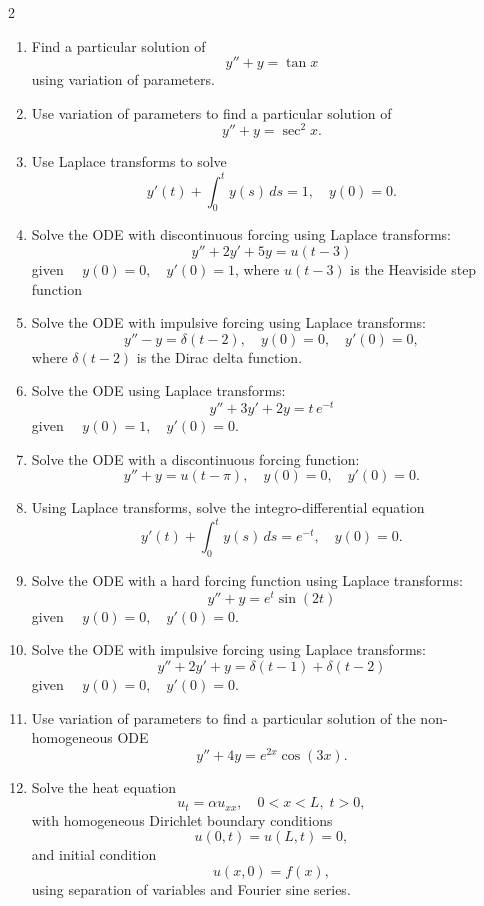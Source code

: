 \begin{multicols}{2}
\begin{enumerate}
  \item Find a particular solution of
    \[
    y'' + y = \tan x
    \]
    using variation of parameters.
    
  \item Use variation of parameters to find a particular solution of
    \[
    y'' + y = \sec^2 x.
    \]
        
  \item Use Laplace transforms to solve
    \[
    y'(t) + \int_0^t y(s) \, ds = 1, \quad y(0) = 0.
    \]
    
  \item Solve the ODE with discontinuous forcing using Laplace transforms:
    \[
    y'' + 2y' + 5y = u(t-3)
    \]
    given $\quad y(0)=0,\quad y'(0)=1$, where \(u(t-3)\) is the Heaviside step function
    
  \item Solve the ODE with impulsive forcing using Laplace transforms:
    \[
    y'' - y = \delta(t-2),\quad y(0)=0,\quad y'(0)=0,
    \]
    where \(\delta(t-2)\) is the Dirac delta function.
    
  \item Solve the ODE using Laplace transforms:
    \[
    y'' + 3y' + 2y = t\,e^{-t}
    \]
    given $\quad y(0)=1,\quad y'(0)=0.$
  \item Solve the ODE with a discontinuous forcing function:
    \[
    y'' + y = u(t-\pi),\quad y(0)=0,\quad y'(0)=0.
    \]
    
  \item Using Laplace transforms, solve the integro-differential equation
    \[
    y'(t) + \int_0^t y(s)\,ds = e^{-t},\quad y(0)=0.
    \]
    
  \item Solve the ODE with a hard forcing function using Laplace transforms:
    \[
    y'' + y = e^t \sin(2t)
    \]
    given $\quad y(0)=0,\quad y'(0)=0.$

  \item Solve the ODE with impulsive forcing using Laplace transforms:
    \[
    y'' + 2y' + y = \delta(t-1) + \delta(t-2)
    \]
given $\quad y(0)=0,\quad y'(0)=0.$
    
  \item Use variation of parameters to find a particular solution of the non-homogeneous ODE
    \[
    y'' + 4y = e^{2x}\cos(3x).
    \]

  \item Solve the heat equation
    \[
    u_t = \alpha u_{xx},\quad 0<x<L,\;t>0,
    \]
    with homogeneous Dirichlet boundary conditions
    \[
    u(0,t)=u(L,t)=0,
    \]
    and initial condition 
    \[
    u(x,0)=f(x),
    \]
    using separation of variables and Fourier sine series.


\end{enumerate}
\end{multicols}
